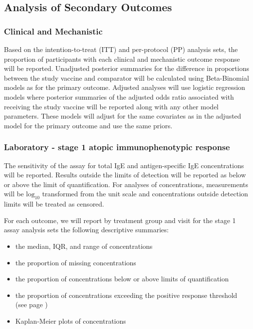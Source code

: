 \documentclass{bmcart}
\begin{document}
\subsection*{Analysis of Secondary Outcomes}

\subsubsection*{Clinical and Mechanistic}

Based on the intention-to-treat (ITT) and per-protocol (PP) analysis sets, the proportion of participants with each clinical and mechanistic outcome response will be reported.
Unadjusted posterior summaries for the difference in proportions between the study vaccine and comparator will be calculated using Beta-Binomial models as for the primary outcome.
Adjusted analyses will use logistic regression models where posterior summaries of the adjusted odds ratio associated with receiving the study vaccine will be reported along with any other model parameters.
These models will adjust for the same covariates as in the adjusted model for the primary outcome and use the same priors.

\subsubsection*{Laboratory - stage 1 atopic immunophenotypic response}

The sensitivity of the assay for total IgE and antigen-specific IgE concentrations will be reported. 
Results outside the limits of detection will be reported as below or above the limit of quantification. 
For analyses of concentrations, measurements will be $\text{log}_{10}$ transformed from the unit scale and concentrations outside detection limits will be treated as censored.

For each outcome, we will report by treatment group and visit for the stage 1 assay analysis sets the following descriptive summaries:
\begin{itemize}
	\item the median, IQR, and range of concentrations
	\item the proportion of missing concentrations
	\item the proportion of concentrations below or above limits of quantification
	\item the proportion of concentrations exceeding the positive response threshold (see page \pageref{lab:sero-thresholds})
	\item Kaplan-Meier plots of concentrations
\end{itemize}
\end{document}
